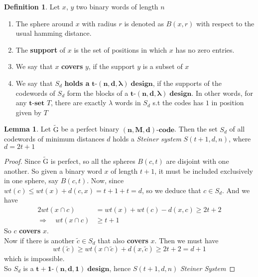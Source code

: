 \documentclass[12pt]{article}
\theoremstyle{definition}
\newtheorem{lemma}[theorem]{Lemma}
\newtheorem{definition}[theorem]{Definition}
\numberwithin{equation}{theorem}
\numberwithin{figure}{theorem}
\newcommand{\tParamDesign}[4]{\ensuremath{\bm{#1\mbox{-}(#2,#3,#4)\; design}}}
\newcommand{\steinerSystem}[3]{\ensuremath{{S(#1,#2,#3)}}}
\newcommand{\pluralMyBlock}{{blocks}}
\newcommand{\cCodes}{\ensuremath{\widetilde{\mathrm{G}}}}
\newcommand{\tSet}[1]{\ensuremath{\bm{#1\mbox{-}{set}}}}
\newcommand{\code}[3]{\ensuremath{\bm{(#1,#2,#3)\mbox{-}code}}}
\begin{document}
\begin{definition}\label{coverSupportHoldDefinition}
	Let $x$, $y$ two binary words of length $n$
	\begin{enumerate}
		\item The sphere around $x$ with radius $r$ is denoted as $B(x,r)$ with respect to the usual hamming distance.
		\item The \textbf{support} of $x$ is the set of positions in which $x$ has no zero entries.
		\item We say that $x$ \textbf{covers} $y$, if the support $y$ is a subset of $x$
		\item We say that $S_d$ \textbf{holds a } {\tParamDesign{t}{n}{d}{\lambda}}, if the supports of the codewords of $S_d$ form the {\pluralMyBlock} of a {\tParamDesign{t}{n}{d}{\lambda}}. In other words, for any {\tSet{t}} $T$, there are exactly $\lambda$ words in $S_d$ s.t the codes has $1$ in position given by $T$
	\end{enumerate}
\end{definition}

\begin{lemma}\label{perfectCdDesign}
Let {\cCodes} be a perfect binary {\code{n}{M}{d}}. Then the set $S_d$ of all codewords of minimum distances $d$ holds a \emph{Steiner system} \steinerSystem{t+1}{d}{n}, where $d = 2t + 1$
\end{lemma}

\begin{proof}
Since {\cCodes} is perfect, so all the spheres $B(c,t)$ are disjoint with one another. So given a binary word $x$ of length $t+1$, it must be included exclusively in one sphere, say $B(c,t)$. Now, since $wt(c) \leq wt(x) + d(c,x) = t + 1 + t = d$, so we deduce that $c \in S_d$. And we have
\begin{align*}
	2wt(x \cap c) &= wt(x) + wt(c) - d(x,c) \geq 2t+2 \\
	\Rightarrow \quad wt(x\cap c) &\geq t + 1
\end{align*}
So $c$ \textbf{covers} $x$. \\
Now if there is another $\tilde{c} \in S_d$ that also \textbf{covers} $x$. Then we must have 
\[
	wt(\tilde{c}) \geq wt(x\cap \tilde{c}) + d(x,\tilde{c}) \geq 2t + 2 = d + 1
\]
 which is impossible. \\
So $S_d$ is a \tParamDesign{t+1}{n}{d}{1}, hence \steinerSystem{t+1}{d}{n} \emph{Steiner System}
\end{proof}
\end{document}
